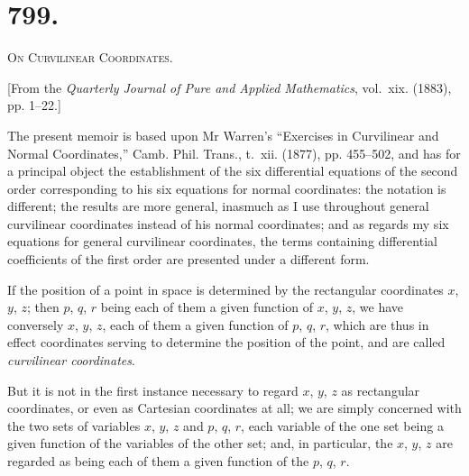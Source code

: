 \documentclass[11pt,a4paper]{article}
\theoremstyle{definition}
\theoremstyle{remark}
\begin{document}
\section*{799.}
\begin{center}
{\large\scshape On Curvilinear Coordinates.}
\end{center}

\begin{flushright}
\small[From the \textit{Quarterly Journal of Pure and Applied Mathematics}, vol.~xix. (1883),\\
pp. 1--22.]
\end{flushright}

The present memoir is based upon Mr Warren's ``Exercises in Curvilinear and Normal Coordinates,'' Camb. Phil. Trans., t.~xii. (1877), pp. 455--502, and has for a principal object the establishment of the six differential equations of the second order corresponding to his six equations for normal coordinates: the notation is different; the results are more general, inasmuch as I use throughout general curvilinear coordinates instead of his normal coordinates; and as regards my six equations for general curvilinear coordinates, the terms containing differential coefficients of the first order are presented under a different form.

If the position of a point in space is determined by the rectangular coordinates $x$, $y$, $z$; then $p$, $q$, $r$ being each of them a given function of $x$, $y$, $z$, we have conversely $x$, $y$, $z$, each of them a given function of $p$, $q$, $r$, which are thus in effect coordinates serving to determine the position of the point, and are called \textit{curvilinear coordinates}.

But it is not in the first instance necessary to regard $x$, $y$, $z$ as rectangular coordinates, or even as Cartesian coordinates at all; we are simply concerned with the two sets of variables $x$, $y$, $z$ and $p$, $q$, $r$, each variable of the one set being a given function of the variables of the other set; and, in particular, the $x$, $y$, $z$ are regarded as being each of them a given function of the $p$, $q$, $r$.
\end{document}
